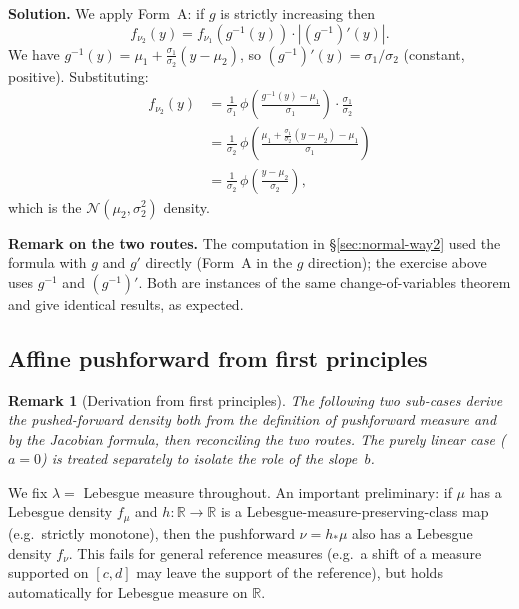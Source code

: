 \documentclass[11pt,a4paper]{article}
\newtheorem{remark}{Remark}
\newcommand{\N}{\mathcal{N}}
\newcommand{\R}{\mathbb{R}}
\begin{document}
\medskip\noindent\textbf{Solution.}
We apply Form~A: if $g$ is strictly increasing then
\[
  f_{\nu_2}(y) = f_{\nu_1}(g^{-1}(y))\cdot|(g^{-1})'(y)|.
\]
We have $g^{-1}(y)=\mu_1+\frac{\sigma_1}{\sigma_2}(y-\mu_2)$, so
$(g^{-1})'(y)=\sigma_1/\sigma_2$ (constant, positive).  Substituting:
\begin{align*}
  f_{\nu_2}(y)
  &= \frac{1}{\sigma_1}\,\phi\!\left(\frac{g^{-1}(y)-\mu_1}{\sigma_1}\right)
     \cdot\frac{\sigma_1}{\sigma_2} \\[4pt]
  &= \frac{1}{\sigma_2}\,\phi\!\left(\frac{\mu_1+\frac{\sigma_1}{\sigma_2}(y-\mu_2)-\mu_1}{\sigma_1}\right) \\[4pt]
  &= \frac{1}{\sigma_2}\,\phi\!\left(\frac{y-\mu_2}{\sigma_2}\right),
\end{align*}
which is the $\N(\mu_2,\sigma_2^2)$ density. \checkmark

\noindent\textbf{Remark on the two routes.}  The computation in \S\ref{sec:normal-way2}
used the formula with $g$ and $g'$ directly (Form~A in the $g$ direction); the
exercise above uses $g^{-1}$ and $(g^{-1})'$.  Both are instances of the same
change-of-variables theorem and give identical results, as expected.

\subsection{Affine pushforward from first principles}
\label{sec:affine-pushforward}

\begin{remark}[Derivation from first principles]
The following two sub-cases derive the
pushed-forward density both from the definition of pushforward measure and by the Jacobian
formula, then reconciling the two routes.  The purely linear case ($a=0$) is treated
separately to isolate the role of the slope~$b$.
\end{remark}

We fix $\lambda=$ Lebesgue measure throughout.
An important preliminary: if $\mu$ has a Lebesgue density $f_\mu$ and $h:\R\to\R$ is a
Lebesgue-measure-preserving-class map (e.g.\ strictly monotone), then the
pushforward $\nu=h_*\mu$ also has a Lebesgue density $f_\nu$.
This fails for general reference measures (e.g.\ a shift of a measure supported on $[c,d]$
may leave the support of the reference), but holds automatically for Lebesgue measure on $\R$.

\end{document}
